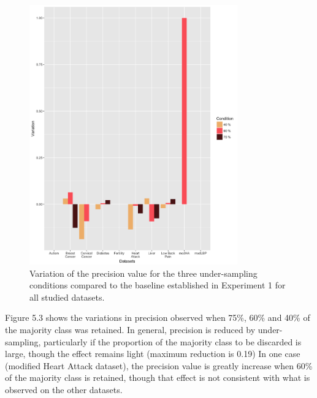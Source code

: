 \begin{figure}[!htbp]
    \centering
    \includegraphics[width=0.8\textwidth]{ThesisTemplate/usingLatex/chapter5Images/PreciVariationUnderBySets.png}
    \caption{Variation of the precision value for the three under-sampling conditions compared to the baseline established in Experiment 1 for all studied datasets.}
    \label{fig:preciVar}
\end{figure}

Figure 5.3 shows the variations in precision observed when 75\%, 60\% and 40\% of the majority class was retained. In general, precision is reduced by under-sampling, particularly if the proportion of the majority class to be discarded is large, though the effect remains light (maximum reduction is 0.19) In one case (modified Heart Attack dataset), the precision value is greatly increase when 60\% of the majority class is retained, though that effect is not consistent with what is observed on the other datasets.\newline

